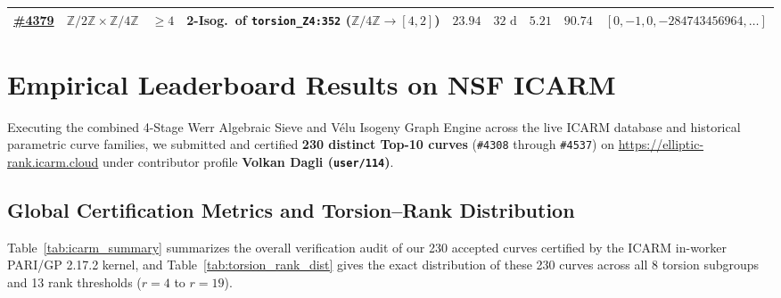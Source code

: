 \documentclass[10pt,a4paper]{article}
\theoremstyle{plain}
\theoremstyle{definition}
\theoremstyle{remark}
\begin{document}
\begin{table}[htbp]
{\begin{tabular}{llclrrrrl}
\href{https://elliptic-rank.icarm.cloud/curve/4379}{\textbf{\#4379}} & $\mathbb{Z}/2\mathbb{Z} \times \mathbb{Z}/4\mathbb{Z}$ & $\ge 4$ & 2-Isog.\ of \texttt{torsion\_Z4:352} ($\mathbb{Z}/4\mathbb{Z} \to [4,2]$) & $23.94$ & $32\text{ d}$ & $5.21$ & $90.74$ & $[0, -1, 0, -284743456964, \dots]$ \\
\bottomrule
\end{tabular}%
}
\end{table}

\section{Empirical Leaderboard Results on NSF ICARM}\label{sec:results}

Executing the combined 4-Stage Werr Algebraic Sieve and V\'{e}lu Isogeny Graph Engine across the live ICARM database and historical parametric curve families, we submitted and certified \textbf{230 distinct Top-10 curves} (\texttt{\#4308} through \texttt{\#4537}) on \url{https://elliptic-rank.icarm.cloud} under contributor profile \textbf{Volkan Dagli (\texttt{user/114})}.

\subsection{Global Certification Metrics and Torsion--Rank Distribution}

Table~\ref{tab:icarm_summary} summarizes the overall verification audit of our 230 accepted curves certified by the ICARM in-worker PARI/GP 2.17.2 kernel, and Table~\ref{tab:torsion_rank_dist} gives the exact distribution of these 230 curves across all 8 torsion subgroups and 13 rank thresholds ($r = 4$ to $r = 19$).
\end{document}
